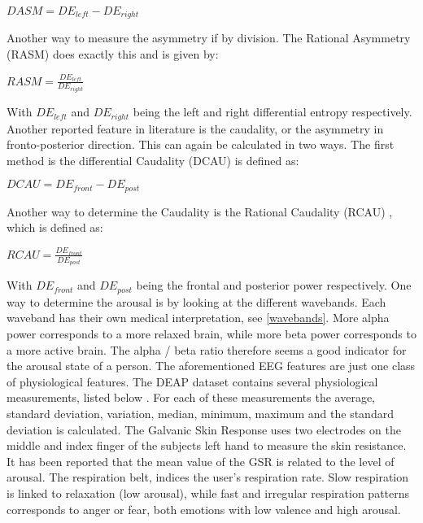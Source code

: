 \begin{center}
$DASM = DE_{left} - DE_{right}$
\end{center}
Another way to measure the asymmetry if by division. The Rational Asymmetry (RASM)  does exactly this and is given by: \\
\begin{center}
$RASM = \frac{DE_{left}}{DE_{right}}$
\end{center}
With $DE_{left}$ and $DE_{right}$ being the left and right differential entropy respectively.
\npar
Another reported feature in literature is the caudality, or the asymmetry in fronto-posterior direction\cite{caudality}. This can again be calculated in two ways. The first method is the differential Caudality (DCAU)  is defined as: \\
\begin{center}
$DCAU = DE_{front} - DE_{post}$
\end{center}
Another way to determine the Caudality is the Rational Caudality (RCAU) , which is defined as:
\begin{center}
$RCAU = \frac{DE_{front}}{DE_{post}}$
\end{center}
With $DE_{front}$ and $DE_{post}$ being the frontal and posterior power respectively.
\npar
One way to determine the arousal is by looking at the different wavebands. Each waveband has their own medical interpretation, see \ref{wavebands}. More alpha power corresponds to a more relaxed brain, while more beta power corresponds to a more active brain. The alpha / beta ratio therefore seems a good indicator for the arousal state of a person.
\npar
The aforementioned EEG features are just one class of physiological features. The DEAP dataset contains several physiological measurements, listed below \citep{DEAP}. For each of these measurements the average, standard deviation, variation, median, minimum, maximum and the standard deviation is calculated.
\npar
The Galvanic Skin Response  uses two electrodes on the middle and index finger of the subjects left hand to measure the skin resistance. It has been reported that the mean value of the GSR is related to the level of arousal\citep{GSR, DEAP}.
\npar
The respiration belt, indices the user's respiration rate. Slow respiration is linked to relaxation (low arousal), while fast and irregular respiration patterns corresponds to anger or fear, both emotions with low valence and high arousal\citep{DEAP}.
